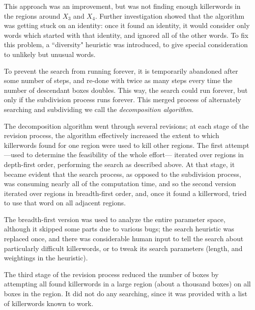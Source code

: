 This approach was an improvement, but was not finding enough killerwords in the regions
around $X_3$ and $X_4$.  Further investigation showed that the
algorithm was getting stuck on an identity: once it found an identity,
it would consider only words which started with that identity, and
ignored all of the other words.  To fix this problem, a ``diversity"
heuristic was introduced, to give special consideration to unlikely but
unusual words.

To prevent the search from running forever, it is
temporarily abandoned after some number of steps, and re-done
with twice as many steps every time the number of descendant boxes
doubles.  This way, the search could run forever, but only if
the subdivision process runs forever.
This merged process of alternately searching and subdividing we
call the {\it decomposition algorithm}.

The decomposition algorithm went through several revisions; at each stage
of the revision process,
the algorithm effectively increased the extent to which killerwords
found for one region were used to kill other regions.  The first
attempt---used to determine the feasibility of the whole effort---
iterated over regions in depth-first order, performing the search as
described above.
At that stage, it became evident that the search process, as
opposed to the subdivision process,
was consuming nearly all of the computation time, and so the second
version iterated over regions in breadth-first order, and, once it
found a killerword, tried to use that word on all adjacent regions.

The breadth-first version was used to analyze the entire parameter
space, although it skipped some parts due to various bugs; the search
heuristic was replaced once, and there was considerable human input
to tell the search about particularly difficult killerwords, or to tweak
its search parameters (length, and weightings in the heuristic).

The third stage of the revision process reduced the number of boxes by attempting all found
killerwords in a large region (about a thousand boxes) on all boxes
in the region.  It did not  do any searching, since it was provided with a
list of killerwords known to work.

